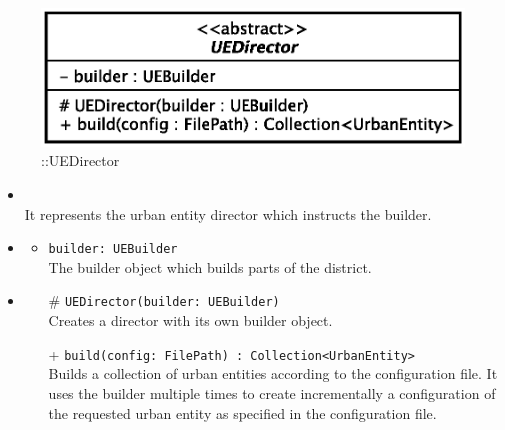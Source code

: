 \begin{figure}[h]
\centering
\includegraphics[scale=0.6,keepaspectratio]{images/solution/u_e_director.eps}
\caption{\pReactiveBuild::UEDirector}
\label{fig:sd-app-uedirector}
\end{figure}
\FloatBarrier
\begin{itemize}
  \item \textbf{\descr} \\
    It represents the urban entity director which instructs the builder.
  \item \textbf{\attrs}
  \begin{itemize}
    \item \texttt{builder: UEBuilder} \\
The builder object which builds parts of the district.
  \end{itemize}
  \item \textbf{\ops}
  \begin{itemize} 
    \item[\#] \texttt{UEDirector(builder: UEBuilder)} \\
Creates a director with its own builder object.
    \item[+] \texttt{build(config: FilePath) : Collection<UrbanEntity>} \\
Builds a collection of urban entities according to the configuration file. It uses the
builder multiple times to create incrementally a configuration of the requested
urban entity as specified in the configuration file.
  \end{itemize}
\end{itemize}
